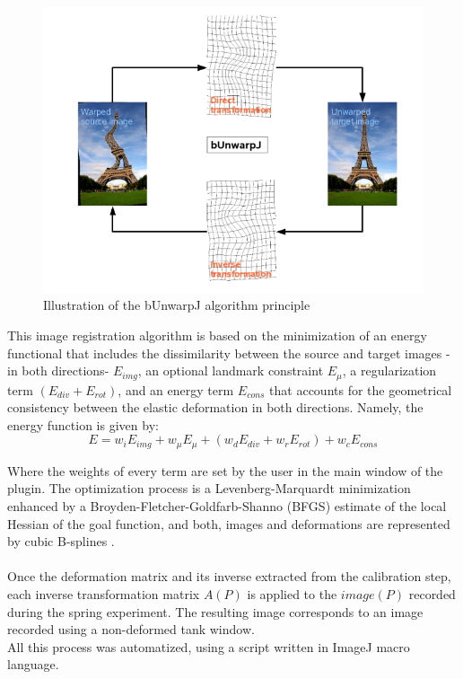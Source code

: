 \begin{figure}[H] %
	\centering%
  \includegraphics[width=\textwidth]{figures/Chapter_1/BUnwarpJ_scheme.png}
	\caption{Illustration of the bUnwarpJ algorithm principle}
	\label{fig:scheme_bunwrapJ}
\end{figure}

This image registration algorithm is based on the minimization of an energy functional that includes the dissimilarity between the source and target images -in both directions- $E_{img}$, an optional landmark constraint $E_{\mu}$, a regularization term $(E_{div} + E_{rot})$, and an energy term $E_{cons}$ that accounts for the geometrical consistency between the elastic deformation in both directions. Namely, the energy function is given by:
\begin{equation*}
		E = w_iE_{img} + w_{\mu}E_{\mu} + (w_dE_{div} + w_rE_{rot}) + w_cE_{cons} 
\end{equation*}
                  

Where the weights of every term are set by the user in the main window of the plugin. The optimization process is a Levenberg-Marquardt minimization enhanced by a Broyden-Fletcher-Goldfarb-Shanno (BFGS) estimate of the local Hessian of the goal function, and both, images and deformations are represented by cubic B-splines \cite{bunwrapJ,unwrapJ}. 

\paragraph{}
Once the deformation matrix and its inverse extracted from the calibration step, each inverse transformation matrix $A(P)$ is applied to the $image(P)$ recorded during the spring experiment. The resulting image corresponds to an image recorded using a non-deformed tank window.\\
All this process was automatized, using a script written in ImageJ macro language.
